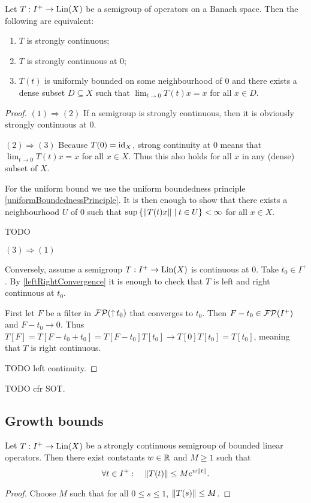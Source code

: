 \begin{proposition}
Let $T:I^+\to \operatorname{Lin}(X)$ be a semigroup of operators on a Banach space. Then the following are equivalent:
\begin{enumerate}
\item $T$ is strongly continuous;
\item $T$ is strongly continuous at $0$;
\item $T(t)$ is uniformly bounded on some neighbourhood of $0$ and there exists a dense subset $D\subseteq X$ such that $\lim_{t\to 0} T(t)x = x$ for all $x\in D$.
\end{enumerate}
\end{proposition}
\begin{proof}
$(1) \Rightarrow (2)$ If a semigroup is strongly continuous, then it is obviously strongly continuous at $0$.

$(2) \Rightarrow (3)$ Because $T(0) = \operatorname{id}_X$, strong continuity at $0$ means that $\lim_{t\to 0} T(t)x = x$ for all $x\in X$. Thus this also holds for all $x$ in any (dense) subset of $X$.

For the uniform bound we use the uniform boundedness principle \ref{uniformBoundednessPrinciple}. It is then enough to show that there exists a neighbourhood $U$ of $0$ such that $\sup\setbuilder{\norm{T(t)x}}{t\in U} <\infty$ for all $x\in X$.

TODO

$(3) \Rightarrow (1)$

Conversely, assume a semigroup $T: I^+\to \operatorname{Lin}(X)$ is continuous at $0$. Take $t_0\in I^+$. By \ref{leftRightConvergence} it is enough to check that $T$ is left and right continuous at $t_0$.

First let $F$ be a filter in $\operatorname{\mathcal{FP}}(\operatorname{\uparrow} t_0)$ that converges to $t_0$. Then $F - t_0 \in \operatorname{\mathcal{FP}}(I^+)$ and $F-t_0 \to 0$. Thus $T[F] = T[F-t_0 + t_0] = T[F-t_0]T[t_0] \to T[0]T[t_0] = T[t_0]$, meaning that $T$ is right continuous.

TODO left continuity.
\end{proof}
TODO cfr SOT.

\subsection{Growth bounds}
\begin{proposition}
Let $T: I^+ \to \operatorname{Lin}(X)$ be a strongly continuous semigroup of bounded linear operators. Then there exist contstants $w\in \mathbb{R}$ and $M\geq 1$ such that
\[ \forall t\in I^+:\quad \lVert T(t)\rVert \leq Me^{w\lVert t\rVert}. \]
\end{proposition}
\begin{proof}
Choose $M$ such that for all $0\leq s\leq 1$, $\lVert T(s)\rVert\leq M$.
\end{proof}



